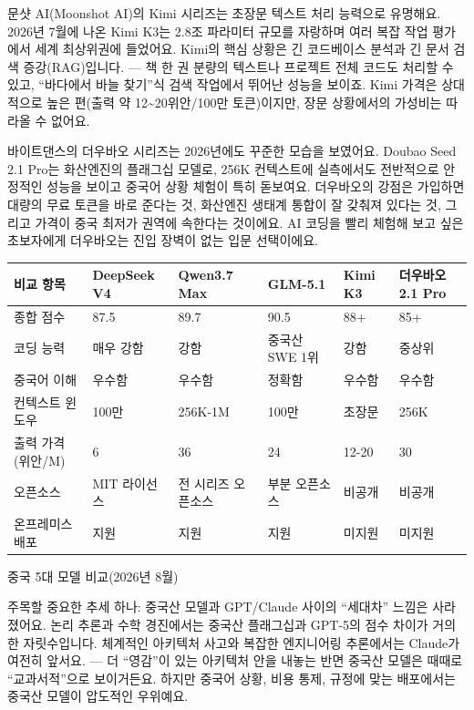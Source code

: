 
문샷 AI(Moonshot AI)의 Kimi 시리즈는 초장문 텍스트 처리 능력으로 유명해요. 2026년 7월에 나온 Kimi K3는 2.8조 파라미터 규모를 자랑하며 여러 복잡 작업 평가에서 세계 최상위권에 들었어요. Kimi의 핵심 상황은 긴 코드베이스 분석과 긴 문서 검색 증강(RAG)입니다. — 책 한 권 분량의 텍스트나 프로젝트 전체 코드도 처리할 수 있고, “바다에서 바늘 찾기”식 검색 작업에서 뛰어난 성능을 보이죠. Kimi 가격은 상대적으로 높은 편(출력 약 12\textasciitilde{}20위안/100만 토큰)이지만, 장문 상황에서의 가성비는 따라올 수 없어요.


바이트댄스의 더우바오 시리즈는 2026년에도 꾸준한 모습을 보였어요. Doubao Seed 2.1 Pro는 화산엔진의 플래그십 모델로, 256K 컨텍스트에 실측에서도 전반적으로 안정적인 성능을 보이고 중국어 상황 체험이 특히 돋보여요. 더우바오의 강점은 가입하면 대량의 무료 토큰을 바로 준다는 것, 화산엔진 생태계 통합이 잘 갖춰져 있다는 것, 그리고 가격이 중국 최저가 권역에 속한다는 것이에요. AI 코딩을 빨리 체험해 보고 싶은 초보자에게 더우바오는 진입 장벽이 없는 입문 선택이에요.

\begin{center}
\begin{tabularx}{\linewidth}{|X|X|X|X|X|X|}
\hline
\textbf{비교 항목} & \textbf{DeepSeek V4} & \textbf{Qwen3.7 Max} & \textbf{GLM-5.1} & \textbf{Kimi K3} & \textbf{더우바오 2.1 Pro} \tabularnewline
\hline
종합 점수 & 87.5 & 89.7 & 90.5 & 88+ & 85+ \tabularnewline
코딩 능력 & 매우 강함 & 강함 & 중국산 SWE 1위 & 강함 & 중상위 \tabularnewline
중국어 이해 & 우수함 & 우수함 & 정확함 & 우수함 & 우수함 \tabularnewline
컨텍스트 윈도우 & 100만 & 256K-1M & 100만 & 초장문 & 256K \tabularnewline
출력 가격(위안/M) & 6 & 36 & 24 & 12-20 & 30 \tabularnewline
오픈소스 & MIT 라이선스 & 전 시리즈 오픈소스 & 부분 오픈소스 & 비공개 & 비공개 \tabularnewline
온프레미스 배포 & 지원 & 지원 & 지원 & 미지원 & 미지원 \tabularnewline
\hline
\end{tabularx}
\end{center}

\begin{center}\small\color{gray}중국 5대 모델 비교(2026년 8월)\end{center}

주목할 중요한 추세 하나: 중국산 모델과 GPT/Claude 사이의 “세대차” 느낌은 사라졌어요. 논리 추론과 수학 경진에서는 중국산 플래그십과 GPT-5의 점수 차이가 거의 한 자릿수입니다. 체계적인 아키텍처 사고와 복잡한 엔지니어링 추론에서는 Claude가 여전히 앞서요. — 더 “영감”이 있는 아키텍처 안을 내놓는 반면 중국산 모델은 때때로 “교과서적”으로 보이거든요. 하지만 중국어 상황, 비용 통제, 규정에 맞는 배포에서는 중국산 모델이 압도적인 우위예요.

